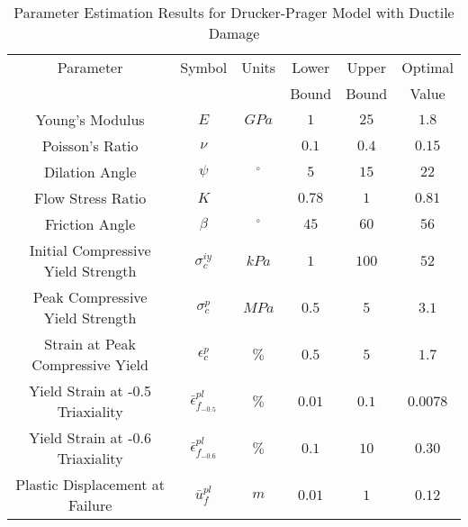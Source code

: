 \begin{table}[!htbp]
\centering
\caption{Parameter Estimation Results for Drucker-Prager Model with Ductile Damage}
\label{tab:paramDrucker}
\begin{tabular}{@{}cccccc@{}}
\toprule
Parameter                                  & Symbol                            & Units      & Lower  & Upper  & Optimal  \\                                               &                              &            &  Bound &  Bound &  Value \\ \midrule
Young's Modulus                            & $E$                               & $GPa$      & $1$         & $25$        & $1.8$        \\
Poisson's Ratio                            & $\nu$                             &            & $0.1$      & $0.4$      & $0.15$        \\
Dilation Angle                             & $\psi$                            & $^{\circ}$ & $5$         & $15$        & $22$        \\
Flow Stress Ratio                          & $K$                               &            & $0.78$      & $1$         & $0.81$        \\
Friction Angle                             & $\beta$                           & $^{\circ}$ & $45$        & $60$        & $56$        \\
Initial Compressive Yield Strength         & $\sigma_c^{iy}$                   & $kPa$      & $1$         & $100$       & $52$        \\
Peak Compressive Yield Strength             & $\sigma_c^{p}$                    & $MPa$      & $0.5$       & $5$         & $3.1$        \\
Strain at Peak Compressive Yield           & $\epsilon_c^{p}$                 & $\%$       & $0.5$       & $5$         & $1.7$        \\
Yield Strain at -0.5 Triaxiality           & $\bar{\epsilon}^{pl}_{f_{-0.5}}$  & $\%$       & $0.01$      & $0.1$       & $0.0078$       \\
Yield Strain at -0.6 Triaxiality          & $\bar{\epsilon}^{pl}_{f_{-0.6}}$ & $\%$       & $0.1$       & $10$        & $0.30$        \\
Plastic Displacement at Failure            & $\bar{u}^{pl}_f$                  & $m$        & $0.01$      & $1$         & $0.12$      \\ \bottomrule
\end{tabular}
\end{table}

